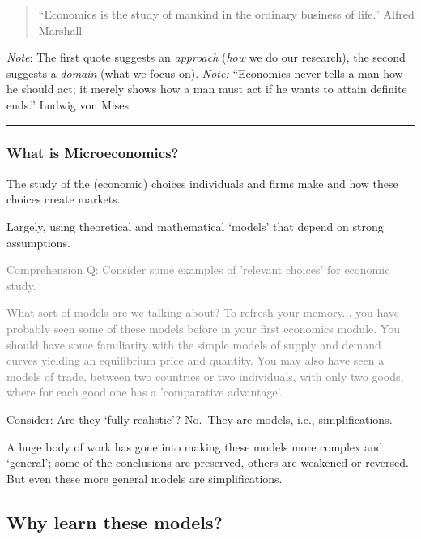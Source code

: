 \documentclass[]{article}
\begin{document}
\begin{quote}
``Economics is the study of mankind in the ordinary business of life.''
Alfred Marshall
\end{quote}

\emph{Note}: The first quote suggests an \emph{approach} (\emph{how} we
do our research), the second suggests a \emph{domain} (what we focus
on). \emph{Note:} ``Economics never tells a man how he should act; it
merely shows how a man must act if he wants to attain definite ends.''
Ludwig von Mises

\begin{center}\rule{0.5\linewidth}{\linethickness}\end{center}

\hypertarget{what-is-microeconomics}{%
\subsubsection{What is Microeconomics?}\label{what-is-microeconomics}}

The study of the (economic) choices individuals and firms make and how
these choices create markets.

\bigskip

Largely, using theoretical and mathematical `models' that depend on
strong assumptions.

\textcolor{gray}{Comprehension Q: Consider some examples of 'relevant choices' for economic study. }

\textcolor{gray}{What sort of models are we talking about?
To refresh your memory... you have probably seen some of these models before in your first economics module. You should have some familiarity with the simple models of supply and demand curves yielding an equilibrium price and quantity. You may also have seen a models of trade, between two countries or two individuals, with only two goods, where for each good one has a 'comparative advantage'.
}

Consider: Are they `fully realistic'? No.~They are models, i.e.,
simplifications.

A huge body of work has gone into making these models more complex and
`general'; some of the conclusions are preserved, others are weakened or
reversed. But even these more general models are simplifications.

\hypertarget{why-learn-these-models}{%
\subsection{Why learn these models?}\label{why-learn-these-models}}
\end{document}
